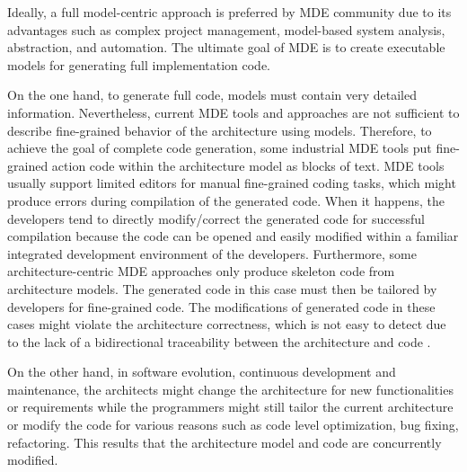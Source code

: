 Ideally, a full model-centric approach is preferred by MDE community due to its advantages \cite{Selic2012} such as complex project management, model-based system analysis, abstraction, and automation. 
The ultimate goal of MDE is to create executable models for generating full implementation code.


On the one hand, to generate full code, models must contain very detailed information. Nevertheless, current MDE tools and approaches are not sufficient to describe fine-grained behavior of the architecture using models. Therefore, to achieve the goal of complete code generation, some industrial MDE tools put fine-grained action code within the architecture model as blocks of text. MDE tools usually support limited editors for manual fine-grained coding tasks, which might produce errors during compilation of the generated code. When it happens, the developers tend to directly modify/correct the generated code for successful compilation because the code can be opened and easily modified within a familiar integrated development environment of the developers. Furthermore, some architecture-centric MDE approaches \cite{zheng2013classification} only produce skeleton code from architecture models. The generated code in this case must then be tailored by developers for fine-grained code. The modifications of generated code in these cases might violate the architecture correctness, which is not easy to detect due to the lack of a bidirectional traceability between the architecture and code \cite{ubayashi2010archface}.

On the other hand, in software evolution, continuous development and maintenance, the architects might change the architecture for new functionalities or requirements while the programmers might still tailor the current architecture or modify the code for various reasons such as code level optimization, bug fixing, refactoring. This results that the architecture model and code are concurrently modified. 




